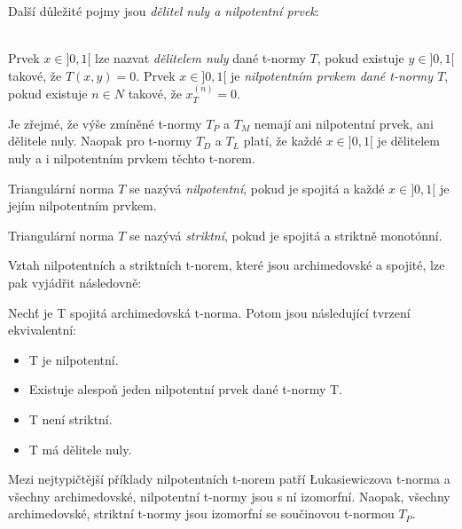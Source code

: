     Dal\v s\'i d\r uležité  pojmy jsou \textit{dělitel nuly a nilpotentn\'i prvek}:
    \begin{definition}
        \cite{KMP}\\
        Prvek $x \in ]0,1[$ lze nazvat {\em dělitelem nuly} dané t-normy $T$, pokud
        existuje $y \in ]0,1[$ takové, že $T(x,y) = 0.$
        Prvek $x \in ]0,1[$ je {\em nilpotentním prvkem dané t-normy $T$}, pokud existuje $n \in N$ takové,
        že $ x_T^{(n)} =0.$
    \end{definition}

    \begin{example}
        Je zřejmé, že výše zmíněné t-normy $T_P$ a $T_M$ nemají ani nilpotentní prvek, ani dělitele nuly. Naopak pro t-normy $T_D$ a $T_L$ platí, že každé $x \in ]0,1[$ je dělitelem nuly a i nilpotentním prvkem těchto t-norem.
    \end{example}

    \begin{definition}
    \cite{KMP}
        Triangul\'arn\'i norma $T$ se naz\'yv\'a {\em nilpotentní}, pokud je spojitá a každé $x
        \in ]0,1[$ je jejím nilpotentním prvkem.
    \end{definition}    
    \begin{definition}
    \cite{KMP}
        Triangul\'arn\'i norma $T$ se naz\'yv\'a {\em striktní}, pokud je
            spojitá a striktně monot\' onní.
    \end{definition} 
    
     Vztah nilpotentních a striktních t-norem, které jsou archimedovské a spojité, lze pak vyjádřit následovně:
    \begin{sentence}\cite{KMP}
        Nech\' t je T spojitá archimedovská t-norma. Potom jsou následující tvrzení ekvivalentní:
        \begin{itemize}
        \item T je nilpotentní.
        \item  Existuje alespo\v n jeden nilpotentní prvek dané t-normy T.
        \item T není striktní.
        \item  T má dělitele nuly.
        \end{itemize}
    \end{sentence}
    Mezi nejtypičtější příklady nilpotentních t-norem patří Łukasiewiczova t-norma a všechny archimedovsk\'e, nilpotentní t-normy jsou s ní izomorfní. Naopak, v\v sechny archimedovsk\'e, striktn\'i t-normy jsou izomorfn\'i se sou\v cinovou t-normou $T_P.$
    

